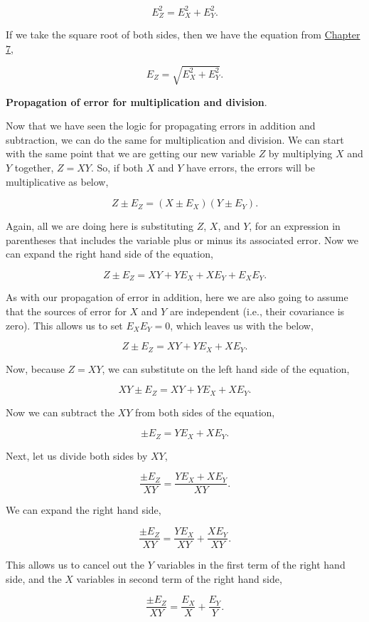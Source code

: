 \documentclass[
]{scrbook}
\begin{document}
\[E_Z^2 = E_X^2 + E_Y^2.\]

If we take the square root of both sides, then we have the equation from \protect\hyperlink{Chapter_7}{Chapter 7},

\[E_Z = \sqrt{E_X^2 + E_Y^2}.\]

\textbf{Propagation of error for multiplication and division}.

Now that we have seen the logic for propagating errors in addition and subtraction, we can do the same for multiplication and division.
We can start with the same point that we are getting our new variable \(Z\) by multiplying \(X\) and \(Y\) together, \(Z = XY\). So, if both \(X\) and \(Y\) have errors, the errors will be multiplicative as below,

\[Z \pm E_Z = (X \pm E_X)(Y \pm E_Y).\]

Again, all we are doing here is substituting \(Z\), \(X\), and \(Y\), for an expression in parentheses that includes the variable plus or minus its associated error.
Now we can expand the right hand side of the equation,

\[Z \pm E_Z = XY + Y E_X + X E_Y + E_X E_Y.\]

As with our propagation of error in addition, here we are also going to assume that the sources of error for \(X\) and \(Y\) are independent (i.e., their covariance is zero).
This allows us to set \(E_{X}E_{Y} = 0\), which leaves us with the below,

\[Z \pm E_Z = XY + Y E_X + X E_Y.\]

Now, because \(Z = XY\), we can substitute on the left hand side of the equation,

\[XY \pm E_Z = XY + Y E_X + X E_Y.\]

Now we can subtract the \(XY\) from both sides of the equation,

\[\pm E_Z = Y E_X + X E_Y.\]

Next, let us divide both sides by \(XY\),

\[\frac{\pm E_Z}{XY} = \frac{Y E_X + X E_Y}{XY}.\]

We can expand the right hand side,

\[\frac{\pm E_Z}{XY} = \frac{Y E_X}{XY} +\frac{X E_Y}{XY}.\]

This allows us to cancel out the \(Y\) variables in the first term of the right hand side, and the \(X\) variables in second term of the right hand side,

\[\frac{\pm E_Z}{XY} = \frac{E_X}{X} +\frac{E_Y}{Y}.\]
\end{document}
